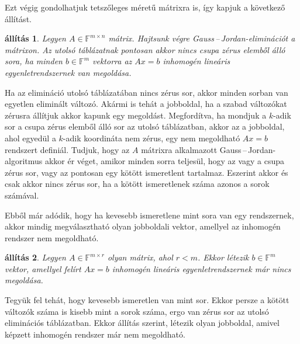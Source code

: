\documentclass[9pt, a4paper, showtrims]{memoir}
\makeatletter
\renewenvironment{proof}[1][\proofname]
    {\par\pushQED{\qed}%
    \normalfont \topsep6\p@\@plus6\p@\relax
    \trivlist
    \item[\hskip\labelsep
        \itshape
    #1\@addpunct{:}]\ignorespaces}
    {\popQED\endtrivlist\@endpefalse}
\theoremstyle{plain}
\newtheorem{proposition}{állítás}[chapter]
\theoremstyle{remark}
\theoremstyle{definition}
\makeatother
\begin{document}
Ezt végig gondolhatjuk tetszőleges méretű mátrixra is, így kapjuk a következő állítást.
\begin{proposition}
    Legyen $A\in\mathbb{F}^{m\times n}$ mátrix.
    Hajtsunk végre Gauss\,--\,Jordan-eliminációt a mátrixon.
    Az utolsó táblázatnak pontosan akkor nincs csupa zérus elemből álló sora,
    ha minden $b\in\mathbb{F}^m$ vektorra az 
    $Ax=b$ inhomogén lineáris egyenletrendszernek van megoldása.
    \label{pr:nincsmo}
\end{proposition}
\begin{proof}
    Ha az elimináció utolsó táblázatában nincs zérus sor, akkor minden sorban van egyetlen eliminált változó. 
    Akármi is tehát a jobboldal, ha a szabad változókat zérusra állítjuk akkor kapunk egy megoldást.
    Megfordítva, ha mondjuk a $k$-adik sor a csupa zérus elemből álló sor az utolsó táblázatban, 
    akkor az a jobboldal, ahol egyedül a $k$-adik koordináta nem zérus,
    egy nem megoldható $Ax=b$ rendszert definiál.
\end{proof}
	Tudjuk, hogy az $A$ mátrixra alkalmazott Gauss\,--\,Jordan-algoritmus  akkor ér véget, amikor
	minden sorra teljesül, hogy az vagy a csupa zérus sor, vagy az pontosan egy kötött ismeretlent tartalmaz.
	Eszerint akkor és csak akkor nincs zérus sor, ha a kötött ismeretlenek száma azonos a sorok számával.

Ebből már adódik, hogy ha kevesebb ismeretlene mint sora van egy rendszernek, 
akkor mindig megválasztható olyan jobboldali vektor, 
amellyel az inhomogén rendszer nem megoldható.
\begin{proposition}
	Legyen $A\in\mathbb{F}^{m\times r}$ olyan mátrix, ahol $r<m$.
	Ekkor létezik $b\in\mathbb{F}^m$ vektor,
	amellyel felírt $Ax=b$ inhomogén lineáris egyenletrendszernek már nincs megoldása.
\end{proposition}
\begin{proof}
	Tegyük fel tehát, hogy kevesebb ismeretlen van mint sor.
    Ekkor persze a kötött változók száma is kisebb mint a sorok száma,
    ergo van zérus sor az utolsó eliminációs táblázatban.
    Ekkor  állítás szerint, létezik olyan jobboldal, amivel képzett inhomogén rendszer már nem megoldható.
\end{proof}
\end{document}
